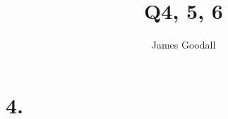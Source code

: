 \documentclass{article}
\author{James Goodall}
\title{Q4, 5, 6}
\begin{document}
\maketitle

\section{4.}
    \subsection{}
\end{document}
